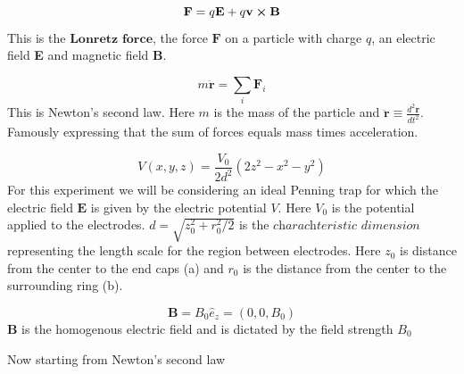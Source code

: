 \documentclass[english,notitlepage,reprint,nofootinbib]{revtex4-1}  %
\begin{document}
\begin{equation}
    \textbf{F} = q\textbf{E} + q \textbf{v} \cross \textbf{B}
\end{equation}\label{eq:lorentz}
This is the $\textbf{Lonretz force}$, the force $\textbf{F}$ on a particle 
with charge $q$, an electric field \textbf{E} and magnetic field \textbf{B}.

\begin{equation}
    m \ddot{\textbf{r}} = \sum_i \textbf{F}_i
\end{equation}\label{eq:N2L}
This is Newton's second law. Here $m$ is the mass of the particle and $\ddot{\textbf{r}} \equiv \frac{d^2 \textbf{r}}{dt^2}$. 
Famously expressing that the sum of forces equals mass times acceleration.

\begin{equation}
    V(x,y,z) = \frac{V_0}{2d^2} (2z^2 - x^2 - y^2)
\end{equation}\label{eq:}
For this experiment we will be considering an ideal Penning trap for which the electric field $\textbf{E}$ is given by the electric potential $V$. 
Here $V_0$ is the potential applied to the electrodes. $d = \sqrt{z_0^2 + r_0^2 / 2}$ is the $\textit{charachteristic dimension}$ representing the length scale 
for the region between electrodes. Here $z_0$ is distance from the center to the end caps (a) and $r_0$ is the distance from the center 
to the surrounding ring (b).

\begin{equation}
    \textbf{B} = B_0 \hat{e}_z = (0,0,B_0)
\end{equation}
$\textbf{B}$ is the homogenous electric field and is dictated by the field strength $B_0$

Now starting from Newton's second law 
\end{document}
